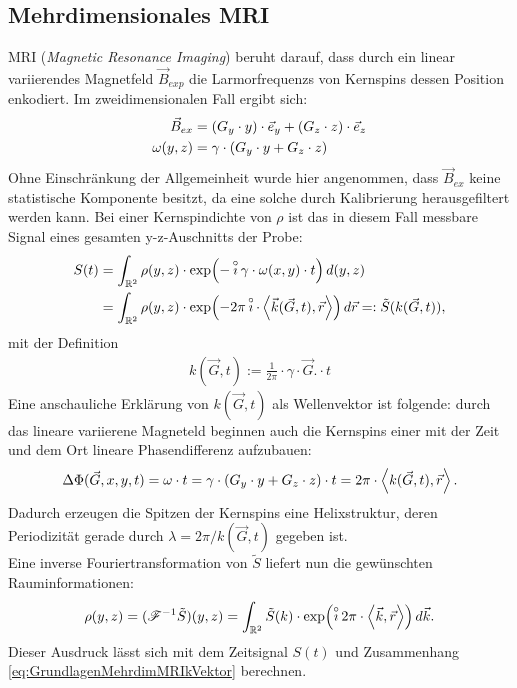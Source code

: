 \documentclass[../main.tex]{subfiles}
\begin{document}
\subsection{Mehrdimensionales MRI}
    MRI (\textit{Magnetic Resonance Imaging}) beruht darauf, dass durch ein linear variierendes Magnetfeld $\vec B_{exp}$ die Larmorfrequenzs von Kernspins dessen Position enkodiert. Im zweidimensionalen Fall ergibt sich:
    \begin{align*}
        \vec B_{ex} &= (G_y\cdot y)\cdot\vec e_y + (G_z\cdot z)\cdot\vec e_z\\
        \omega(y, z) &= \gamma\cdot\left(G_y\cdot y + G_z\cdot z\right)
    \end{align*}
    Ohne Einschränkung der Allgemeinheit wurde hier angenommen, dass $\vec B_{ex}$ keine statistische Komponente besitzt, da eine solche durch Kalibrierung herausgefiltert werden kann. Bei einer Kernspindichte von $\rho$ ist das in diesem Fall messbare Signal eines gesamten y-z-Auschnitts der Probe: 
    \begin{align*}
        S(t) &= \int_{\mathbb{R}^2} \rho(y,z)\cdot\exp(-\operatorname{\overset\circ\imath}\gamma\cdot\omega(x,y)\cdot t)\,d(y,z)\\
        &= \int_{\mathbb{R}^2}\rho(y,z)\cdot\exp(-2\pi\operatorname{\overset\circ\imath}\cdot\left\langle \vec{k}(\vec{G}, t),\vec{r}\right\rangle)\, d\vec{r} =: \tilde S(k(\vec{G}, t)),
    \end{align*}
    mit der Definition 
    \begin{align}
        k(\vec{G}, t):= \frac{1}{2\pi}\cdot \gamma\cdot\vec{G}.
        \label{eq:GrundlagenMehrdimMRIkVektor}\cdot t
    \end{align}
    Eine anschauliche Erklärung von $k(\vec{G}, t)$ als Wellenvektor ist folgende: durch das lineare variierene Magneteld beginnen auch die Kernspins einer mit der Zeit und dem Ort lineare Phasendifferenz aufzubauen:
    \[ 
        \Delta\Phi(\vec{G}, x,y,t) = \omega\cdot t = \gamma\cdot(G_y\cdot y + G_z\cdot z)\cdot t = 2\pi\cdot \left\langle k(\vec{G},t),\vec r\right\rangle.
    \]
    Dadurch erzeugen die Spitzen der Kernspins eine Helixstruktur, deren Periodizität gerade durch $\lambda = 2\pi/ k(\Vec{G},t)$ gegeben ist.\\

    Eine inverse Fouriertransformation von $\tilde S$ liefert nun die gewünschten Rauminformationen:
    \[
        \rho(y,z) = (\mathcal{F}^{-1}\tilde S)(y,z) = \int_{\mathbb{R}^2} \tilde S(k)\cdot\exp(\operatorname{\overset\circ\imath} 2\pi\cdot\left\langle \vec{k},\vec {r}\right\rangle)\,d\vec{k}.
    \]
    Dieser Ausdruck lässt sich mit dem Zeitsignal $S(t)$ und Zusammenhang \eqref{eq:GrundlagenMehrdimMRIkVektor} berechnen.\\
\end{document}
